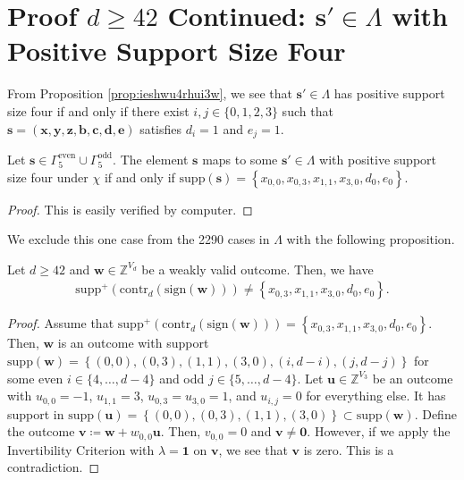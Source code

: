 \section{Proof \( d \geq 42\) Continued: \( \mathbf{s}' \in \Lambda\) with Positive Support Size Four}

\begin{corollary}
    From Proposition \ref{prop:ieshwu4rhui3w}, we see that \( \mathbf{s}' \in \Lambda \) has positive support size four if and only if there exist \( i,j \in \{ 0, 1,2,3 \} \) such that \( \mathbf{s} = (\mathbf{x}, \mathbf{y}, \mathbf{z}, \mathbf{b}, \mathbf{c}, \mathbf{d}, \mathbf{e}) \) satisfies \( d_i = 1 \) and \( e_j = 1 \).
\end{corollary}

\begin{corollary}
    Let \( \mathbf{s} \in \Gamma^{\mathrm{even}}_5 \cup \Gamma^{\mathrm{odd}}_5 \). The element \( \mathbf{s} \) maps to some \( \mathbf{s}' \in \Lambda \) with positive support size four under \( \chi \) if and only if \( \mathrm{supp}(\mathbf{s}) = \left\{ x_{0,0}, x_{0,3}, x_{1,1}, x_{3,0}, d_0, e_0 \right\} \).
\end{corollary}

\begin{proof}
    This is easily verified by computer.
\end{proof}

We exclude this one case from the 2290 cases in \( \Lambda \) with the following proposition.

\begin{proposition}
    Let \( d \geq 42 \) and \( \mathbf{w} \in \mathbb{Z}^{V_d} \) be a weakly valid outcome. Then, we have 
    \begin{align*}
        \mathrm{supp}^+(\mathrm{contr}_d(\mathrm{sign}(\mathbf{w}))) \neq \left\{ x_{0,3}, x_{1,1}, x_{3,0}, d_0, e_0 \right\}.
    \end{align*}
\end{proposition}

\begin{proof}
    Assume that \( \mathrm{supp}^+(\mathrm{contr}_d(\mathrm{sign}(\mathbf{w}))) = \left\{ x_{0,3}, x_{1,1}, x_{3,0}, d_0, e_0 \right\} \).
    Then, \( \mathbf{w} \) is an outcome with support \(  \mathrm{supp}(\mathbf{w}) = \left\{ (0,0), (0,3), (1,1), (3,0), (i,d-i), (j, d-j) \right\} \)
    for some even \( i \in \{ 4,\dots, d-4 \}\) and odd \( j \in \{5, \dots, d-4 \} \). Let \( \mathbf{u} \in \mathbb{Z}^{V_3} \) be an outcome with \( u_{0,0} = -1 \), \( u_{1,1} = 3 \), \( u_{0,3} = u_{3,0} = 1 \), and \( u_{i,j} = 0 \) for everything else. 
    It has support in \( \mathrm{supp}(\mathbf{u}) = \left\{ (0,0), (0,3), (1,1), (3,0) \right\}  \subset  \mathrm{supp}(\mathbf{w})\). Define the outcome \( \mathbf{v} \coloneqq \mathbf{w} +w_{0,0} \mathbf{u} \). Then, \( v_{0,0} = 0 \) and \( \mathbf{v} \neq \mathbf{0} \). However, if we apply the Invertibility Criterion with \( \lambda = \mathbf{1} \) on \( \mathbf{v} \), we see that \( \mathbf{v} \) is zero. This is a contradiction.
\end{proof}

